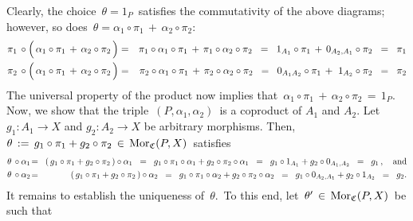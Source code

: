 \begin{enumerate}
\begin{center}
	\end{center}
	Clearly, the choice \,$\theta = 1_{P}$\, satisfies the commutativity of the above diagrams;
	however, so does \,$\theta = \alpha_{1} \circ \pi_{1} \,+\, \alpha_{2} \circ \pi_{2}$:\,
	\begin{eqnarray*}
	\pi_{1} \,\circ \left(\,\alpha_{1} \circ \pi_{1} \,\overset{{\color{white}.}}{+}\, \alpha_{2} \circ \pi_{2}\,\right)
	& = &
		\pi_{1} \circ \alpha_{1} \circ \pi_{1} \,+\, \pi_{1} \circ \alpha_{2} \circ \pi_{2}
	\;\; = \;\;
		1_{A_{1}} \circ \pi_{1} \,+\, 0_{A_{2},A_{1}} \circ \pi_{2}
	\;\; = \;\;
		\pi_{1}
	\\
	\pi_{2} \,\circ \left(\,\alpha_{1} \circ \pi_{1} \,\overset{{\color{white}.}}{+}\, \alpha_{2} \circ \pi_{2}\,\right)
	& = &
		\pi_{2} \circ \alpha_{1} \circ \pi_{1} \,+\, \pi_{2} \circ \alpha_{2} \circ \pi_{2}
	\;\; = \;\;
		0_{A_{1}A_{2}} \circ \pi_{1} \,+\, \,1_{A_{2}} \circ \pi_{2}
	\;\; = \;\;
		\pi_{2}
	\end{eqnarray*}
	The universal property of the product now implies that
	\,$\alpha_{1} \circ \pi_{1} \,+\, \alpha_{2} \circ \pi_{2} \,=\, 1_{P}$.\,
	\vskip 0.1cm
	\noindent
	Now, we show that the triple \,$(P,\alpha_{1},\alpha_{2})$\, is a coproduct of $A_{1}$ and $A_{2}$.
	Let $g_{1} : A_{1} \longrightarrow X$ and $g_{2} : A_{2} \longrightarrow X$ be arbitrary morphisms.
	Then,
	\,$\theta \, := \, g_{1} \circ \pi_{1} + g_{2} \circ \pi_{2} \, \in \, \textnormal{Mor}_{\mathfrak{C}}(P,X)$\,
	satisfies
	\begin{eqnarray*}
	\theta \,\circ \alpha_{1}
	& \!=\! &
		(\,g_{1} \circ \pi_{1} + g_{2} \circ \pi_{2}\,) \circ \alpha_{1}
	\;\; = \;\;
		g_{1} \circ \pi_{1} \circ \alpha_{1} + g_{2} \circ \pi_{2} \circ \alpha_{1}
	\;\; = \;\;
		g_{1} \circ 1_{A_{1}} + g_{2} \circ 0_{A_{1},A_{2}}
	\;\; = \;\;
		g_{1}\,,
	\quad\textnormal{and}
	\\
	\theta \,\circ \alpha_{2}
	& \!=\! &
		(\,g_{1} \circ \pi_{1} + g_{2} \circ \pi_{2}\,) \circ \alpha_{2}
	\;\; = \;\;
		g_{1} \circ \pi_{1} \circ \alpha_{2} + g_{2} \circ \pi_{2} \circ \alpha_{2}
	\;\; = \;\;
		g_{1} \circ 0_{A_{2},A_{1}} + g_{2} \circ 1_{A_{2}}
	\;\; = \;\;
		g_{2}.
	\end{eqnarray*}
	It remains to establish the uniqueness of \,$\theta$.\,
	To this end, let \,$\theta^{\prime} \,\in\, \textnormal{Mor}_{\mathfrak{C}}(P,X)$\, be such that

\end{enumerate}
